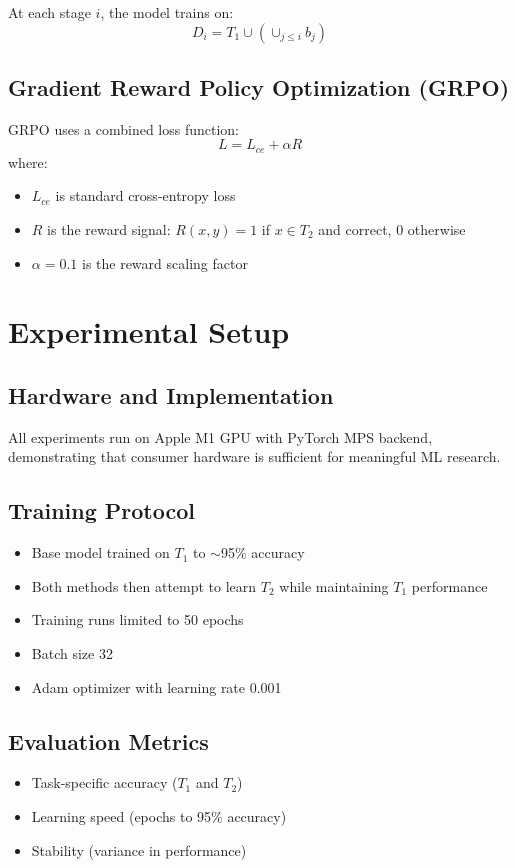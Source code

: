 \documentclass[11pt]{article}
\begin{document}
At each stage $i$, the model trains on:
\begin{equation}
    D_i = T_1 \cup (\cup_{j\leq i} b_j)
\end{equation}

\subsection{Gradient Reward Policy Optimization (GRPO)}
GRPO uses a combined loss function:
\begin{equation}
    L = L_{ce} + \alpha R
\end{equation}
where:
\begin{itemize}
    \item $L_{ce}$ is standard cross-entropy loss
    \item $R$ is the reward signal: $R(x, y) = 1$ if $x \in T_2$ and correct, 0 otherwise
    \item $\alpha = 0.1$ is the reward scaling factor
\end{itemize}

\section{Experimental Setup}

\subsection{Hardware and Implementation}
All experiments run on Apple M1 GPU with PyTorch MPS backend, demonstrating that consumer hardware is sufficient for meaningful ML research.

\subsection{Training Protocol}
\begin{itemize}
    \item Base model trained on $T_1$ to $\sim$95\% accuracy
    \item Both methods then attempt to learn $T_2$ while maintaining $T_1$ performance
    \item Training runs limited to 50 epochs
    \item Batch size 32
    \item Adam optimizer with learning rate 0.001
\end{itemize}

\subsection{Evaluation Metrics}
\begin{itemize}
    \item Task-specific accuracy ($T_1$ and $T_2$)
    \item Learning speed (epochs to 95\% accuracy)
    \item Stability (variance in performance)
\end{itemize}
\end{document}
